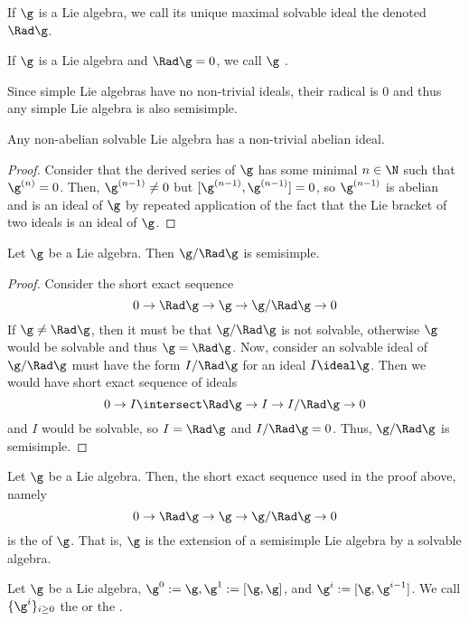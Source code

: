 \documentclass[11pt,leqno,oneside]{amsart}
\numberwithin{thm}{section}
\begin{document}
\begin{defn}
  If \(\g\) is a Lie algebra, we call its unique maximal solvable
  ideal the  denoted \(\Rad \g\). 
\end{defn}
\begin{defn}
  If \(\g\) is a Lie algebra and \(\Rad \g = 0\), we call \(\g\)
  . 
\end{defn}
\begin{rmk}
  Since simple Lie algebras have no non-trivial ideals, their radical
  is \(0\) and thus any simple Lie algebra is also semisimple.
\end{rmk}
\begin{prop}\label{solvable-has-non-trivial-abelian-ideal}
  Any non-abelian solvable Lie algebra has a non-trivial abelian
  ideal.
\end{prop}
\begin{proof}
  Consider that the derived series of \(\g\) has some minimal \(n \in
  \N\) 
  such that \(\g^{(n)} = 0\). Then, \(\g^{(n-1)} \neq 0\) but
  \([\g^{(n-1)}, \g^{(n-1)}] = 0\), so \(\g^{(n-1)}\) is abelian and
  is an ideal of \(\g\) by repeated application of the fact that the
  Lie bracket of two ideals is an ideal of \(\g\).
\end{proof}
\begin{prop}
  Let \(\g\) be a Lie algebra. Then \(\g / \Rad \g\) is semisimple.
\end{prop}
\begin{proof}
  Consider the short exact sequence \[
    0 \to \Rad \g \to \g \to \g / \Rad \g \to 0
  \]
  If \(\g \neq \Rad \g\), then it must be that \(\g / \Rad \g\) is not
  solvable, otherwise \(\g\) would be solvable and thus \(\g = \Rad
  \g\). Now, consider an solvable ideal of \(\g/\Rad \g\) must have
  the form \(I/\Rad \g\) for an ideal \(I \ideal \g\). Then we would
  have short exact sequence of ideals \[
    0 \to I \intersect \Rad \g \to I \to I/\Rad \g \to 0
  \]
  and \(I\) would be solvable, so \(I = \Rad \g\) and \(I/\Rad \g =
  0\). Thus, \(\g / \Rad \g\) is semisimple.
\end{proof}
\begin{defn}\label{levi-decomp}
  Let \(\g\) be a Lie algebra. Then, the short exact sequence used in
  the proof above, namely \[
    0 \to \Rad \g \to \g \to \g/\Rad \g \to 0
  \]
  is the  of \(\g\). That is, \(\g\) is the
  extension of a semisimple Lie algebra by a solvable algebra. 
\end{defn}
\begin{defn}
  Let \(\g\) be a Lie algebra, \(\g^0 := \g, \g^1 := [\g,\g]\), and \(\g^i := [\g, \g^{i-1}]\). We
  call \(\{\g^i\}_{i \geq 0}\) the 
  or the .
\end{defn}
\end{document}
